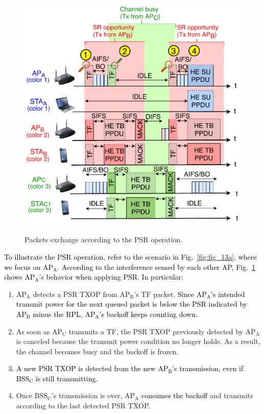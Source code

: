 \documentclass[preprint,12pt]{elsarticle}
\begin{document}
\begin{figure}[ht!]
	\centering
	\includegraphics[width=.55\columnwidth]{fig_13b}
	\caption{Packets exchange according to the PSR operation.}
	\label{fig:fig_13b}
\end{figure}

\textcolor{black}{To illustrate the PSR operation, refer to the scenario in Fig.~\ref{fig:fig_13a}, where we focus on $\text{AP}_\text{A}$. According to the interference sensed by each other AP, Fig.~\ref{fig:fig_13b} shows $\text{AP}_\text{A}$'s behavior when applying PSR. In particular:}
\begin{enumerate}
	\item $\text{AP}_\text{A}$ detects a PSR TXOP from $\text{AP}_\text{B}$'s TF packet. \textcolor{black}{Since $\text{AP}_\text{A}$'s intended transmit power for the next queued packet is below the PSR indicated by $\text{AP}_\text{B}$ minus the RPL, $\text{AP}_\text{A}$'s backoff keeps counting down.}
	\item As soon as $\text{AP}_\text{C}$ transmits a TF, the PSR TXOP previously detected by $\text{AP}_\text{A}$ is canceled because the transmit power condition no longer holds. As a result, the channel becomes busy and the backoff is frozen.
	\item \textcolor{black}{A new PSR TXOP is detected  from the new $\text{AP}_\text{B}$'s transmission, even if $\text{BSS}_\text{C}$ is still transmitting.}
	\item Once $\text{BSS}_\text{C}$'s transmission is over, $\text{AP}_\text{A}$ \textcolor{black}{consumes the backoff} and transmits according to the last detected PSR TXOP.
\end{enumerate}

\end{document}
